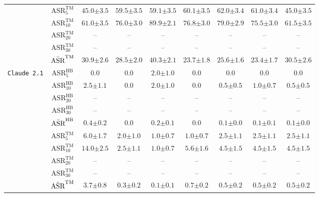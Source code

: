 \begin{table}[H]
{\begin{tabular}{c|c||c|c|c|c||c|c|c}
\cline{2-9}
& $\text{ASR}^{\text{TM}}_{5}$ & $45.0{\pm 3.5}$ & $59.5{\pm 3.5}$ & $59.1{\pm 3.5}$ & $60.1{\pm 3.5}$ & $\mathbf{62.0{\pm 3.4}}$ & $61.0{\pm 3.4}$ & $45.0{\pm 3.5}$ \\
& $\text{ASR}^{\text{TM}}_{10}$ & $61.0{\pm 3.5}$ & $76.0{\pm 3.0}$ & $\mathbf{89.9{\pm 2.1}}$ & $76.8{\pm 3.0}$ & $79.0{\pm 2.9}$ & $75.5{\pm 3.0}$ & $61.5{\pm 3.5}$ \\
& $\text{ASR}^{\text{TM}}_{20}$ & -- & -- & -- & -- & -- & -- & -- \\
& $\text{ASR}^{\text{TM}}_{30}$ & -- & -- & -- & -- & -- & -- & -- \\
& $\Bar{\text{ASR}}^{\text{TM}}$ & $30.9{\pm 2.6}$ & $28.5{\pm 2.0}$ & $\mathbf{40.3{\pm 2.1}}$ & $23.7{\pm 1.8}$ & $25.6{\pm 1.6}$ & $23.4{\pm 1.7}$ & $30.5{\pm 2.6}$ \\
\hline
\hline
\multirow{11}{*}{\texttt{Claude 2.1}} 
& $\text{ASR}^{\text{HB}}_{5}$ & $0.0$ & $0.0$ & $\mathbf{2.0{\pm 1.0}}$ & $0.0$ & $0.0$ & $0.0$ & $0.0$ \\
& $\text{ASR}^{\text{HB}}_{10}$ & $\mathbf{2.5{\pm 1.1}}$ & $0.0$ & $2.0{\pm 1.0}$ & $0.0$ & $0.5{\pm 0.5}$ & $1.0{\pm 0.7}$ & $0.5{\pm 0.5}$ \\
& $\text{ASR}^{\text{HB}}_{20}$ & -- & -- & -- & -- & -- & -- & -- \\
& $\text{ASR}^{\text{HB}}_{30}$ & -- & -- & -- & -- & -- & -- & -- \\
& $\Bar{\text{ASR}}^{\text{HB}}$ & $\mathbf{0.4{\pm 0.2}}$ & $0.0$ & $0.2{\pm 0.1}$ & $0.0$ & $0.1{\pm 0.0}$ & $0.1{\pm 0.1}$ & $0.1{\pm 0.0}$ \\
\cline{2-9}
& $\text{ASR}^{\text{TM}}_{5}$ & $\mathbf{6.0{\pm 1.7}}$ & $2.0{\pm 1.0}$ & $1.0{\pm 0.7}$ & $1.0{\pm 0.7}$ & $2.5{\pm 1.1}$ & $2.5{\pm 1.1}$ & $2.5{\pm 1.1}$ \\
& $\text{ASR}^{\text{TM}}_{10}$ & $\mathbf{14.0{\pm 2.5}}$ & $2.5{\pm 1.1}$ & $1.0{\pm 0.7}$ & $5.6{\pm 1.6}$ & $4.5{\pm 1.5}$ & $4.5{\pm 1.5}$ & $4.5{\pm 1.5}$ \\
& $\text{ASR}^{\text{TM}}_{20}$ & -- & -- & -- & -- & -- & -- & -- \\
& $\text{ASR}^{\text{TM}}_{30}$ & -- & -- & -- & -- & -- & -- & -- \\
& $\Bar{\text{ASR}}^{\text{TM}}$ & $\mathbf{3.7{\pm 0.8}}$ & $0.3{\pm 0.2}$ & $0.1{\pm 0.1}$ & $0.7{\pm 0.2}$ & $0.5{\pm 0.2}$ & $0.5{\pm 0.2}$ & $0.5{\pm 0.2}$ \\
\hline




\end{tabular}}
\end{table}
